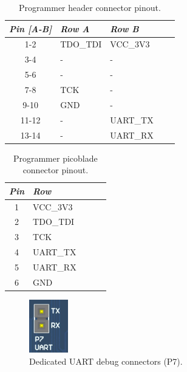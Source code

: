 \begin{table}[!h]
    \centering
    \begin{tabular}{cllll}
        \toprule[1.5pt]
        \textit{Pin [A-B]} & \textit{Row A} & \textit{Row B} \\
        \midrule
        1-2                & TDO\_TDI       & VCC\_3V3       \\
        3-4                & -              & -              \\
        5-6                & -              & -              \\
        7-8                & TCK            & -              \\
        9-10               & GND            & -              \\
        11-12              & -              & UART\_TX       \\
        13-14              & -              & UART\_RX       \\
        \bottomrule[1.5pt]
    \end{tabular}
    \caption{Programmer header connector pinout.}
    \label{tab:jtag-header-connector-pins}
\end{table}

\begin{table}[!h]
    \centering
    \begin{tabular}{cllll}
        \toprule[1.5pt]
        \textit{Pin} & \textit{Row} \\
        \midrule
        1            & VCC\_3V3       \\
        2            & TDO\_TDI       \\
        3            & TCK            \\
        4            & UART\_TX       \\
        5            & UART\_RX       \\
        6            & GND            \\
        \bottomrule[1.5pt]
    \end{tabular}
    \caption{Programmer picoblade connector pinout.}
    \label{tab:jtag-picoblade-connector-pins}
\end{table}

\begin{figure}[!ht]
    \begin{center}
        \includegraphics[width=0.15\textwidth]{figures/p7-connector.png}
        \caption{Dedicated UART debug connectors (P7).}
        \label{fig:uart-debug-connector}
    \end{center}
\end{figure}

